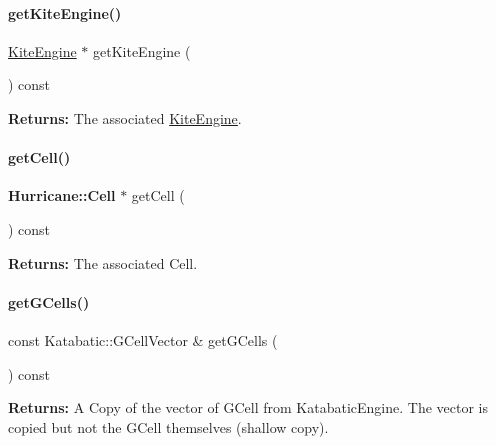 \paragraph{\texorpdfstring{get\+Kite\+Engine()}{getKiteEngine()}}
{\footnotesize\ttfamily \hyperlink{classKite_1_1KiteEngine}{Kite\+Engine} $\ast$ get\+Kite\+Engine (\begin{DoxyParamCaption}{ }\end{DoxyParamCaption}) const\hspace{0.3cm}{\ttfamily [inline]}}

{\bfseries Returns\+:} The associated \hyperlink{classKite_1_1KiteEngine}{Kite\+Engine}. \mbox{\label{classKite_1_1NegociateWindow_a5ea0f667687d3a832f8c9806ccbe6792}} 
\paragraph{\texorpdfstring{get\+Cell()}{getCell()}}
{\footnotesize\ttfamily \textbf{ Hurricane\+::\+Cell} $\ast$ get\+Cell (\begin{DoxyParamCaption}{ }\end{DoxyParamCaption}) const}

{\bfseries Returns\+:} The associated Cell. \mbox{\label{classKite_1_1NegociateWindow_ad8902daa6817d4275be5e3a37eb24424}} 
\paragraph{\texorpdfstring{get\+G\+Cells()}{getGCells()}}
{\footnotesize\ttfamily const Katabatic\+::\+G\+Cell\+Vector \& get\+G\+Cells (\begin{DoxyParamCaption}{ }\end{DoxyParamCaption}) const\hspace{0.3cm}{\ttfamily [inline]}}

{\bfseries Returns\+:} A Copy of the vector of G\+Cell from Katabatic\+Engine. The vector is copied but not the G\+Cell themselves (shallow copy). \mbox{\label{classKite_1_1NegociateWindow_a80fc29623500b168c49ba14c49a00a76}} 
